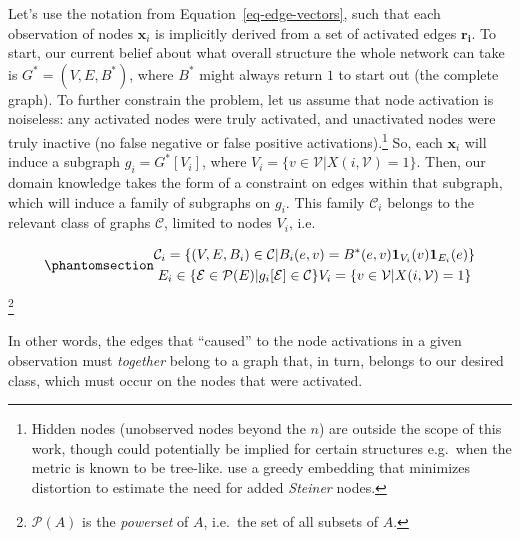 \documentclass[%
	12pt,
		oneside,
		letterpaper
]{book}
\begin{document}
Let's use the notation from Equation~\ref{eq-edge-vectors}, such that
each observation of nodes \(\mathbf{x}_i\) is implicitly derived from a
set of activated edges \(\mathbf{r_i}\). To start, our current belief
about what overall structure the whole network can take is
\(G^*=(V,E,B^*)\), where \(B^*\) might always return \(1\) to start out
(the complete graph). To further constrain the problem, let us assume
that node activation is noiseless: any activated nodes were truly
activated, and unactivated nodes were truly inactive (no false negative
or false positive activations).\footnote{ Hidden nodes (unobserved nodes
  beyond the \(n\)) are outside the scope of this work, though could
  potentially be implied for certain structures e.g.~when the metric is
  known to be tree-like. \textcite{TreeIam_Sonthalia2020} use a greedy
  embedding that minimizes distortion to estimate the need for added
  \emph{Steiner} nodes.} So, each \(\mathbf{x}_i\) will induce a
subgraph \(g_i = G^*[V_i]\), where
\(V_i = \{v\in \mathcal{V} | X(i,\mathcal{V})=1\}\). Then, our domain
knowledge takes the form of a constraint on edges within that subgraph,
which will induce a family of subgraphs on \(g_i\). This family
\(\mathcal{C}_i\) belongs to the relevant class of graphs
\(\mathcal{C}\), limited to nodes \(V_i\), i.e.

\begin{equation}\phantomsection\label{eq-subgraph-family}{
\begin{gathered}
\mathcal{C}_i = \{(V,E,B_i) \in\mathcal{C}|B_i(e,v)=B^*(e,v)\mathbf{1}_{V_i}(v)\mathbf{1}_{E_i}(e)\}\\
E_i\in\{\mathcal{E}\in\mathcal{P}(E)| g_i[\mathcal{E}]\in\mathcal{C}\}
V_i = \{v\in \mathcal{V} | X(i,\mathcal{V})=1\}
\end{gathered}
}\end{equation}\footnote{\(\mathcal{P}(A)\) is the \emph{powerset} of
  \(A\), i.e.~the set of all subsets of \(A\).}

In other words, the edges that ``caused'' to the node activations in a
given observation must \emph{together} belong to a graph that, in turn,
belongs to our desired class, which must occur on the nodes that were
activated.
\end{document}
